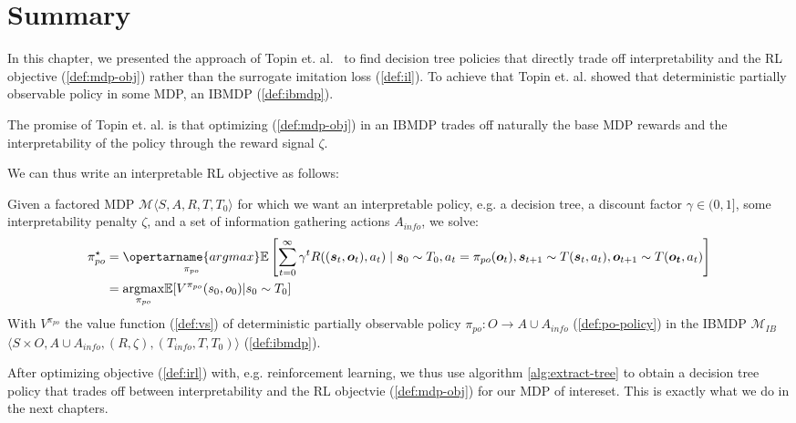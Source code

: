 \section{Summary}
In this chapter, we presented the approach of Topin et. al.~\cite{topin2021iterative} to find decision tree policies that directly trade off interpretability and the RL objective (\ref{def:mdp-obj}) rather than the surrogate imitation loss (\ref{def:il}).
To achieve that Topin et. al. showed that deterministic partially observable policy in some MDP, an IBMDP (\ref{def:ibmdp}).

The promise of Topin et. al. is that optimizing (\ref{def:mdp-obj}) in an IBMDP trades off naturally the base MDP rewards and the interpretability of the policy through the reward signal $\zeta$.

We can thus write an interpretable RL objective as follows:
\begin{definition}\label{def:irl}
    Given a factored MDP $\mathcal{M} \langle S, A, R, T, T_0 \rangle$ for which we want an interpretable policy, e.g. a decision tree, a discount factor $\gamma \in (0,1]$, some interpretability penalty $\zeta$, and a set of information gathering actions $A_{info}$, we solve:
\begin{align*}
    \pi^\star_{po} &= \underset{\pi_{po}}{\opertarname{argmax}} \mathbb{E}\left[\sum_{t=0}^{\infty} \gamma^t R((\boldsymbol{s}_t, \boldsymbol{o}_t), a_t) \mid \boldsymbol{s}_0 \sim T_0, a_t = \pi_{po}(\boldsymbol{o}_t), \boldsymbol{s}_{t+1} \sim T(\boldsymbol{s}_t, a_t), \boldsymbol{o}_{t+1}\sim T(\boldsymbol{o_t}, a_t)\right]\\
    &= \underset{\pi_{po}}{\operatorname{argmax}} \mathbb{E}[V^{\pi_{po}}(s_0, o_0)| s_0\sim T_0]
\end{align*}
With $V^{\pi_{po}}$ the value function (\ref{def:vs}) of deterministic partially observable policy $\pi_{po}: O \rightarrow A\cup A_{info}$ (\ref{def:po-policy}) in the IBMDP $\mathcal{M}_{IB}$ $\langle S \times O,A \cup A_{info}, (R, \zeta), (T_{info}, T, T_0)\rangle$ (\ref{def:ibmdp}).
\end{definition}

After optimizing objective (\ref{def:irl}) with, e.g. reinforcement learning, we thus use algorithm \ref{alg:extract-tree} to obtain a decision tree policy that trades off between interpretability and the RL objectvie (\ref{def:mdp-obj}) for our MDP of intereset.
This is exactly what we do in the next chapters.
        
